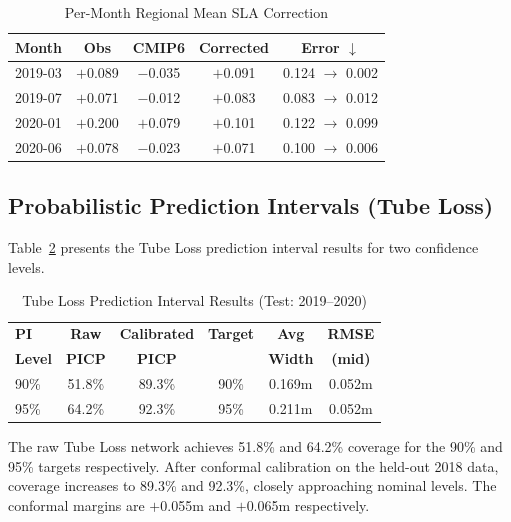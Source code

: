 \documentclass[conference]{IEEEtran}
\begin{document}
\begin{table}[H]
\centering
\caption{Per-Month Regional Mean SLA Correction}
\label{tab:demo}
\begin{tabular}{@{}lcccc@{}}
\toprule
\textbf{Month} & \textbf{Obs} & \textbf{CMIP6} & \textbf{Corrected} & \textbf{Error $\downarrow$} \\
\midrule
2019-03 & $+$0.089 & $-$0.035 & $+$0.091 & 0.124 $\to$ 0.002 \\
2019-07 & $+$0.071 & $-$0.012 & $+$0.083 & 0.083 $\to$ 0.012 \\
2020-01 & $+$0.200 & $+$0.079 & $+$0.101 & 0.122 $\to$ 0.099 \\
2020-06 & $+$0.078 & $-$0.023 & $+$0.071 & 0.100 $\to$ 0.006 \\
\bottomrule
\end{tabular}
\end{table}

\subsection{Probabilistic Prediction Intervals (Tube Loss)}

Table~\ref{tab:tube_results} presents the Tube Loss prediction interval results for two confidence levels.

\begin{table}[H]
\centering
\caption{Tube Loss Prediction Interval Results (Test: 2019--2020)}
\label{tab:tube_results}
\begin{tabular}{@{}lccccc@{}}
\toprule
\textbf{PI} & \textbf{Raw} & \textbf{Calibrated} & \textbf{Target} & \textbf{Avg} & \textbf{RMSE} \\
\textbf{Level} & \textbf{PICP} & \textbf{PICP} & & \textbf{Width} & \textbf{(mid)} \\
\midrule
90\% & 51.8\% & 89.3\% & 90\% & 0.169m & 0.052m \\
95\% & 64.2\% & 92.3\% & 95\% & 0.211m & 0.052m \\
\bottomrule
\end{tabular}
\end{table}

The raw Tube Loss network achieves 51.8\% and 64.2\% coverage for the 90\% and 95\% targets respectively. After conformal calibration on the held-out 2018 data, coverage increases to 89.3\% and 92.3\%, closely approaching nominal levels. The conformal margins are $+$0.055m and $+$0.065m respectively.
\end{document}
